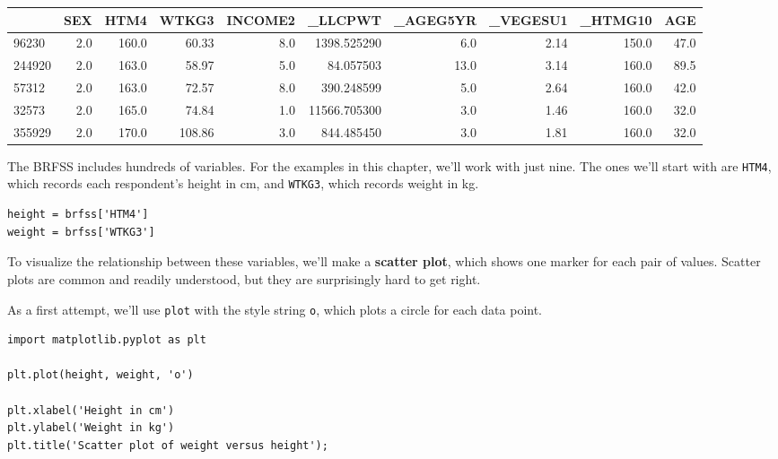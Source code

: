 \begin{tabular}{lrrrrrrrrr}
\midrule
{} &  SEX &   HTM4 &   WTKG3 &  INCOME2 &       \_LLCPWT &  \_AGEG5YR &  \_VEGESU1 &  \_HTMG10 &   AGE \\
\midrule
96230  &  2.0 &  160.0 &   60.33 &      8.0 &   1398.525290 &       6.0 &      2.14 &    150.0 &  47.0 \\
244920 &  2.0 &  163.0 &   58.97 &      5.0 &     84.057503 &      13.0 &      3.14 &    160.0 &  89.5 \\
57312  &  2.0 &  163.0 &   72.57 &      8.0 &    390.248599 &       5.0 &      2.64 &    160.0 &  42.0 \\
32573  &  2.0 &  165.0 &   74.84 &      1.0 &  11566.705300 &       3.0 &      1.46 &    160.0 &  32.0 \\
355929 &  2.0 &  170.0 &  108.86 &      3.0 &    844.485450 &       3.0 &      1.81 &    160.0 &  32.0 \\
\midrule
\end{tabular}

The BRFSS includes hundreds of variables. For the examples in this
chapter, we'll work with just nine. The ones we'll start with are
\passthrough{\lstinline!HTM4!}, which records each respondent's height
in cm, and \passthrough{\lstinline!WTKG3!}, which records weight in kg.

\begin{lstlisting}[]
height = brfss['HTM4']
weight = brfss['WTKG3']
\end{lstlisting}

To visualize the relationship between these variables, we'll make a
\textbf{scatter plot}, which shows one marker for each pair of values.
Scatter plots are common and readily understood, but they are
surprisingly hard to get right.

As a first attempt, we'll use \passthrough{\lstinline!plot!} with the
style string \passthrough{\lstinline!o!}, which plots a circle for each
data point.

\begin{lstlisting}[]
import matplotlib.pyplot as plt

plt.plot(height, weight, 'o')

plt.xlabel('Height in cm')
plt.ylabel('Weight in kg')
plt.title('Scatter plot of weight versus height');
\end{lstlisting}


